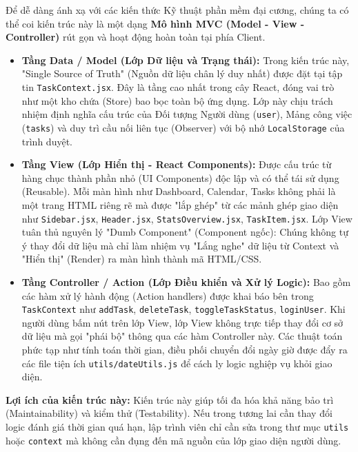Để dễ dàng ánh xạ với các kiến thức Kỹ thuật phần mềm đại cương, chúng ta có thể coi kiến trúc này là một dạng \textbf{Mô hình MVC (Model - View - Controller)} rút gọn và hoạt động hoàn toàn tại phía Client.

\begin{itemize}
    \item \textbf{Tầng Data / Model (Lớp Dữ liệu và Trạng thái):} 
    Trong kiến trúc này, "Single Source of Truth" (Nguồn dữ liệu chân lý duy nhất) được đặt tại tập tin \texttt{TaskContext.jsx}. Đây là tầng cao nhất trong cây React, đóng vai trò như một kho chứa (Store) bao bọc toàn bộ ứng dụng. 
    Lớp này chịu trách nhiệm định nghĩa cấu trúc của Đối tượng Người dùng (\texttt{user}), Mảng công việc (\texttt{tasks}) và duy trì cầu nối liên tục (Observer) với bộ nhớ \texttt{LocalStorage} của trình duyệt. 
    
    \item \textbf{Tầng View (Lớp Hiển thị - React Components):} 
    Được cấu trúc từ hàng chục thành phần nhỏ (UI Components) độc lập và có thể tái sử dụng (Reusable). Mỗi màn hình như Dashboard, Calendar, Tasks không phải là một trang HTML riêng rẽ mà được "lắp ghép" từ các mảnh ghép giao diện như \texttt{Sidebar.jsx}, \texttt{Header.jsx}, \texttt{StatsOverview.jsx}, \texttt{TaskItem.jsx}.
    Lớp View tuân thủ nguyên lý "Dumb Component" (Component ngốc): Chúng không tự ý thay đổi dữ liệu mà chỉ làm nhiệm vụ "Lắng nghe" dữ liệu từ Context và "Hiển thị" (Render) ra màn hình thành mã HTML/CSS.
    
    \item \textbf{Tầng Controller / Action (Lớp Điều khiển và Xử lý Logic):} 
    Bao gồm các hàm xử lý hành động (Action handlers) được khai báo bên trong \texttt{TaskContext} như \texttt{addTask}, \texttt{deleteTask}, \texttt{toggleTaskStatus}, \texttt{loginUser}. Khi người dùng bấm nút trên lớp View, lớp View không trực tiếp thay đổi cơ sở dữ liệu mà gọi "phái bộ" thông qua các hàm Controller này. Các thuật toán phức tạp như tính toán thời gian, điều phối chuyển đổi ngày giờ được đẩy ra các file tiện ích \texttt{utils/dateUtils.js} để cách ly logic nghiệp vụ khỏi giao diện.
\end{itemize}

\textbf{Lợi ích của kiến trúc này:}
Kiến trúc này giúp tối đa hóa khả năng bảo trì (Maintainability) và kiểm thử (Testability). Nếu trong tương lai cần thay đổi logic đánh giá thời gian quá hạn, lập trình viên chỉ cần sửa trong thư mục \texttt{utils} hoặc \texttt{context} mà không cần đụng đến mã nguồn của lớp giao diện người dùng.

